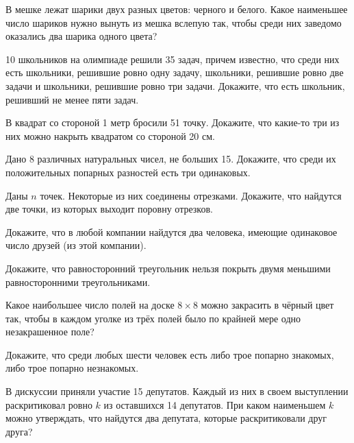 \documentclass{article}
\begin{document}
\begin{enumerate_boxed}
        \item В мешке лежат шарики двух разных цветов: черного и белого.
        Какое наименьшее число шариков нужно вынуть из мешка вслепую так, чтобы среди них заведомо оказались два шарика одного цвета?

        \item 10 школьников на олимпиаде решили 35 задач, причем известно, что среди них есть школьники, решившие ровно одну задачу, школьники, решившие ровно две задачи и школьники, решившие ровно три задачи.
        Докажите, что есть школьник, решивший не менее пяти задач.

        \item В квадрат со стороной 1 метр бросили 51 точку.
        Докажите, что какие-то три из них можно накрыть квадратом со стороной 20 см.

        \item Дано 8 различных натуральных чисел, не больших 15.
        Докажите, что среди их положительных попарных разностей есть три одинаковых.

        \item Даны $n$ точек.
        Некоторые из них соединены отрезками.
        Докажите, что найдутся две точки, из которых выходит поровну отрезков.

        \item Докажите, что в любой компании найдутся два человека, имеющие одинаковое число друзей (из этой компании).

        \item Докажите, что равносторонний треугольник нельзя покрыть двумя меньшими равносторонними треугольниками.

        \item Какое наибольшее число полей на доске $8 \times 8$ можно закрасить в чёрный цвет так, чтобы в каждом уголке из трёх полей было по крайней мере одно незакрашенное поле?

        \item Докажите, что среди любых шести человек есть либо трое попарно знакомых, либо трое попарно незнакомых.

        \item В дискуссии приняли участие 15 депутатов.
        Каждый из них в своем выступлении раскритиковал ровно $k$ из оставшихся 14 депутатов.
        При каком наименьшем $k$ можно утверждать, что найдутся два депутата, которые раскритиковали друг друга?

    \end{enumerate_boxed}
\end{document}
